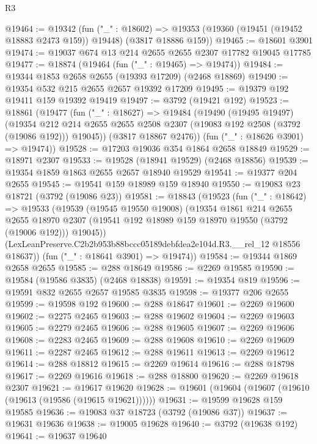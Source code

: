 \begin{lexlean}{R3}
\begin{coremodule}
@19464 := @19342
    (fun ("_" : @18602) =>
    @19353 (@19360 (@19451 (@19452 @18883 @2473 @159)) @19448) (@3817 @18886 @159))
@19465 := @18601 @3901
@19474 := @19037 @674 @13 @214 @2655 @2655 @2307 @17782 @19045 @17785
@19477 := @18874 (@19464 (fun ("_" : @19465) => @19474))
@19484 := @19344 @1853 @2658 @2655 (@19393 @17209) (@2468 @18869)
@19490 := @19354 @532 @215 @2655 @2657 @19392 @17209
@19495 := @19379 @192 @19411 @159 @19392 @19419
@19497 := @3792 (@19421 @192)
@19523 := @18861
    (@19477
      (fun ("_" : @18627) =>
      @19484
        (@19490
          (@19495 @19497)
          (@19354
            @212
            @214
            @2655
            @2655
            @2508
            @2307
            (@19083 @192 @2508 (@3792 (@19086 @192)))
            @19045))
        (@3817 @18867 @2476))
      (fun ("_" : @18626 @3901) => @19474))
@19528 := @17203 @19036 @354 @1864 @2658 @18849
@19529 := @18971 @2307
@19533 := @19528 (@18941 @19529) (@2468 @18856)
@19539 := @19354 @1859 @1863 @2655 @2657 @18940 @19529
@19541 := @19377 @204 @2655
@19545 := @19541 @159 @18989 @159 @18940
@19550 := @19083 @23 @18721 (@3792 (@19086 @23))
@19581 := @18843
    (@19523
      (fun ("_" : @18642) =>
      @19533
        (@19539
          (@19545 @19550 @19008)
          (@19354
            @1861
            @214
            @2655
            @2655
            @18970
            @2307
            (@19541 @192 @18989 @159 @18970 @19550 (@3792 (@19006 @192)))
            @19045))
        (LexLeanPreserve.C2b2b953b88bccc05189debfdea2e104d.R3.__rel_12 @18556 @18637))
      (fun ("_" : @18641 @3901) => @19474))
@19584 := @19344 @1869 @2658 @2655
@19585 := @288 @18649
@19586 := @2269 @19585
@19590 := @19584 (@19586 @3835) (@2468 @18838)
@19591 := @19354 @819
@19596 := @19591 @832 @2655 @2657 @19585 @3835
@19598 := @19377 @206 @2655
@19599 := @19598 @192
@19600 := @288 @18647
@19601 := @2269 @19600
@19602 := @2275 @2465
@19603 := @288 @19602
@19604 := @2269 @19603
@19605 := @2279 @2465
@19606 := @288 @19605
@19607 := @2269 @19606
@19608 := @2283 @2465
@19609 := @288 @19608
@19610 := @2269 @19609
@19611 := @2287 @2465
@19612 := @288 @19611
@19613 := @2269 @19612
@19614 := @288 @18812
@19615 := @2269 @19614
@19616 := @288 @18798
@19617 := @2269 @19616
@19618 := @288 @18800
@19620 := @2269 @19618 @2307
@19621 := @19617 @19620
@19628 := @19601 (@19604 (@19607 (@19610 (@19613 (@19586 (@19615 @19621))))))
@19631 := @19599 @19628 @159 @19585
@19636 := @19083 @37 @18723 (@3792 (@19086 @37))
@19637 := @19631 @19636
@19638 := @19005 @19628
@19640 := @3792 (@19638 @192)
@19641 := @19637 @19640

\end{coremodule}
\end{lexlean}
